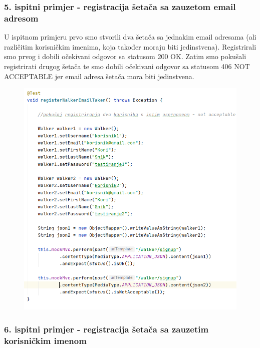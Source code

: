 			
			
			\subsubsection{5. ispitni primjer - registracija šetača sa zauzetom email adresom}
			
			U ispitnom primjeru prvo smo stvorili dva šetača sa jednakim email adresama (ali različitim korisničkim imenima, koja također moraju biti jedinstvena). Registrirali smo prvog i dobili očekivani odgovor sa statusom 200 OK. Zatim smo pokušali registrirati drugog šetača te smo dobili  očekivani odgovor sa statusom 406 NOT ACCEPTABLE jer email adresa šetača mora biti jedinstvena.
			
			
			\begin{figure}[H]
				\centerline{
					\includegraphics[scale=0.75]{slike/walker1.PNG}}
				\centering
			\end{figure}
			
			\newpage
				
			\subsubsection{6. ispitni primjer - registracija šetača sa zauzetim korisničkim imenom}
			
